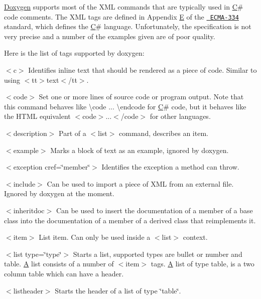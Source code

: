 \mbox{\hyperlink{class_doxygen}{Doxygen}} supports most of the X\+ML commands that are typically used in \mbox{\hyperlink{class_c}{C}}\# code comments. The X\+ML tags are defined in Appendix \mbox{\hyperlink{class_e}{E}} of the \href{http://www.ecma-international.org/publications/standards/Ecma-334.htm}{\texttt{ E\+C\+M\+A-\/334}} standard, which defines the \mbox{\hyperlink{class_c}{C}}\# language. Unfortunately, the specification is not very precise and a number of the examples given are of poor quality.

Here is the list of tags supported by doxygen\+:


\begin{DoxyItemize}
\item {\ttfamily $<$c$>$} Identifies inline text that should be rendered as a piece of code. Similar to using {\ttfamily $<$tt$>$}text{\ttfamily $<$/tt$>$}. 
\item {\ttfamily $<$code$>$} Set one or more lines of source code or program output. Note that this command behaves like \textbackslash{}code ... \textbackslash{}endcode for \mbox{\hyperlink{class_c}{C}}\# code, but it behaves like the H\+T\+ML equivalent {\ttfamily $<$code$>$...$<$/code$>$} for other languages. 
\item {\ttfamily $<$description$>$} Part of a {\ttfamily $<$list$>$} command, describes an item. 
\item {\ttfamily $<$example$>$} Marks a block of text as an example, ignored by doxygen. 
\item {\ttfamily $<$exception cref=\char`\"{}member\char`\"{}$>$} Identifies the exception a method can throw. 
\item {\ttfamily $<$include$>$} Can be used to import a piece of X\+ML from an external file. Ignored by doxygen at the moment. 
\item {\ttfamily $<$inheritdoc$>$} Can be used to insert the documentation of a member of a base class into the documentation of a member of a derived class that reimplements it. 
\item {\ttfamily $<$item$>$} List item. Can only be used inside a {\ttfamily $<$list$>$} context. 
\item {\ttfamily $<$list type=\char`\"{}type\char`\"{}$>$} Starts a list, supported types are {\ttfamily bullet} or {\ttfamily number} and {\ttfamily table}. \mbox{\hyperlink{class_a}{A}} list consists of a number of {\ttfamily $<$item$>$} tags. \mbox{\hyperlink{class_a}{A}} list of type table, is a two column table which can have a header. 
\item {\ttfamily $<$listheader$>$} Starts the header of a list of type \char`\"{}table\char`\"{}. 

\end{DoxyItemize}
